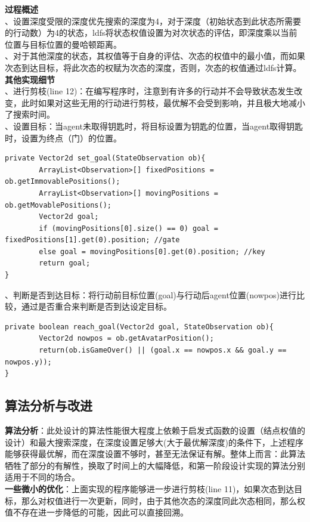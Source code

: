 \documentclass[UTF8]{article}
\begin{document}
\noindent\textbf{过程概述}\\
、设置深度受限的深度优先搜索的深度为4，对于深度（初始状态到此状态所需要的行动数）为4的状态，ldfs将状态权值设置为对次状态的评估，即深度乘以当前位置与目标位置的曼哈顿距离。\\
、对于其他深度的状态，其权值等于自身的评估、次态的权值中的最小值，而如果次态到达目标，将此次态的权赋为次态的深度，否则，次态的权值通过ldfs计算。\\

\noindent\textbf{其他实现细节}\\
、进行剪枝(line 12)：在编写程序时，注意到有许多的行动并不会导致状态发生改变，此时如果对这些无用的行动进行剪枝，最优解不会受到影响，并且极大地减小了搜索时间。\\
、设置目标：当agent未取得钥匙时，将目标设置为钥匙的位置，当agent取得钥匙时，设置为终点（门）的位置。\\
\begin{lstlisting}[caption=设置目标]
private Vector2d set_goal(StateObservation ob){
		ArrayList<Observation>[] fixedPositions = ob.getImmovablePositions();
		ArrayList<Observation>[] movingPositions = ob.getMovablePositions();
		Vector2d goal;
		if (movingPositions[0].size() == 0) goal = fixedPositions[1].get(0).position; //gate
		else goal = movingPositions[0].get(0).position; //key
		return goal;
}
\end{lstlisting}

、判断是否到达目标：将行动前目标位置(goal)与行动后agent位置(nowpos)进行比较，通过是否重合来判断是否到达设定目标。\\

\begin{lstlisting}[caption=判断是否到达目标]
private boolean reach_goal(Vector2d goal, StateObservation ob){
		Vector2d nowpos = ob.getAvatarPosition();
		return(ob.isGameOver() || (goal.x == nowpos.x && goal.y == nowpos.y));
}
\end{lstlisting}

\subsection{算法分析与改进}
\indent\textbf{算法分析}：此处设计的算法性能很大程度上依赖于启发式函数的设置（结点权值的设计）和最大搜索深度，在深度设置足够大(大于最优解深度)的条件下，上述程序能够获得最优解，而在深度设置不够时，甚至无法保证有解。整体上而言：此算法牺牲了部分的有解性，换取了时间上的大幅降低，和第一阶段设计实现的算法分别适用于不同的场合。\\
\indent\textbf{一些微小的优化}：上面实现的程序能够进一步进行剪枝(line 11)，如果次态到达目标，那么对权值进行一次更新，同时，由于其他次态的深度同此次态相同，那么权值不存在进一步降低的可能，因此可以直接回溯。\\
\end{document}
